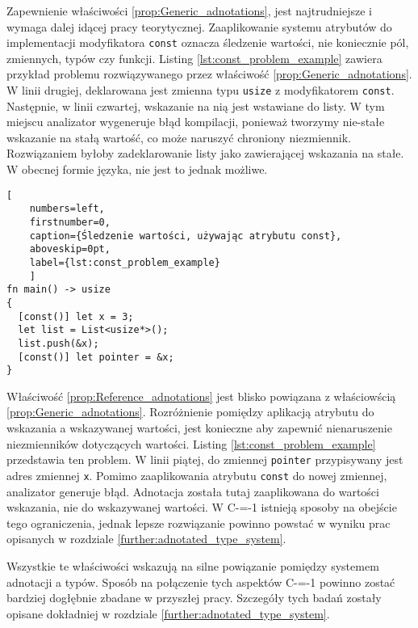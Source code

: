 Zapewnienie właściwości \ref{prop:Generic_adnotations}, jest najtrudniejsze i wymaga dalej idącej pracy teorytycznej.
Zaaplikowanie systemu atrybutów do implementacji modyfikatora \lstinline{const} oznacza śledzenie wartości, nie koniecznie pól, zmiennych, typów czy funkcji.
Listing \ref{lst:const_problem_example} zawiera przykład problemu rozwiązywanego przez właściwość \ref{prop:Generic_adnotations}.
W linii drugiej, deklarowana jest zmienna typu \lstinline{usize} z modyfikatorem \lstinline{const}.
Następnie, w linii czwartej, wskazanie na nią jest wstawiane do listy.
W tym miejscu analizator wygeneruje błąd kompilacji, ponieważ tworzymy nie-stałe wskazanie na stałą wartość, co może naruszyć chroniony niezmiennik.
Rozwiązaniem byłoby zadeklarowanie listy jako zawierającej wskazania na stałe.
W obecnej formie języka, nie jest to jednak możliwe.

\begin{minipage}{\linewidth}
  
  \begin{lstlisting}[
    numbers=left,
    firstnumber=0,
    caption={Śledzenie wartości, używając atrybutu const},
    aboveskip=0pt,
    label={lst:const_problem_example}
    ]
fn main() -> usize
{
  [const()] let x = 3;
  let list = List<usize*>();
  list.push(&x);
  [const()] let pointer = &x;
}
\end{lstlisting}
\end{minipage}


Właściwość \ref{prop:Reference_adnotations} jest blisko powiązana z właściowścią \ref{prop:Generic_adnotations}.
Rozróżnienie pomiędzy aplikacją atrybutu do wskazania a wskazywanej wartości, jest konieczne aby zapewnić nienaruszenie niezmienników dotyczących wartości.
Listing \ref{lst:const_problem_example} przedstawia ten problem.
W linii piątej, do zmiennej \lstinline{pointer} przypisywany jest adres zmiennej \lstinline{x}.
Pomimo zaaplikowania atrybutu \lstinline{const} do nowej zmiennej, analizator generuje błąd.
Adnotacja została tutaj zaaplikowana do wartości wskazania, nie do wskazywanej wartości.
W C-=-1 istnieją sposoby na obejście tego ograniczenia, jednak lepsze rozwiązanie powinno powstać w wyniku prac opisanych w rozdziale \ref{further:adnotated_type_system}.%

Wszystkie te właściwości wskazują na silne powiązanie pomiędzy systemem adnotacji a typów.
Sposób na połączenie tych aspektów C-=-1 powinno zostać bardziej dogłębnie zbadane w przyszłej pracy.
Szczegóły tych badań zostały opisane dokładniej w rozdziale \ref{further:adnotated_type_system}.


